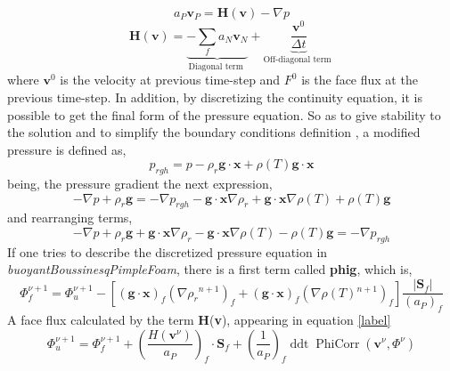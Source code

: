 \begin{equation}
a_{P} \textbf{v}_{P}=\textbf{H}(\textbf{v})-\nabla p
\label{3.15}
\end{equation}
\begin{equation}
\textbf{H}(\textbf{v})=\underbrace{-\sum_{f} a_{N} \textbf{v}_{N}}_{\text {Diagonal term }}+\underbrace{\frac{\textbf{v}^{0}}{\Delta t}}_{\text {Off-diagonal term }}
\label{3.16}
\end{equation}
where $\textbf{v}^{0}$ is the velocity at previous time-step and $F^{0}$ is the face flux at the previous time-step.
\newline
In addition, by discretizing the continuity equation, it is possible to get the final form of the pressure equation.
\newline
So as to give stability to the solution and to simplify the boundary conditions definition \cite{berberovic_van hinsberg_jakirlic_roisman_tropea_2009}, a modified pressure is defined as,
\begin{equation}
p_{r g h}=p-\rho_{r} \textbf{g} \cdot \textbf{x} + \rho(T) \textbf{g} \cdot \textbf{x}
\label{3.17}
\end{equation}
being, the pressure gradient the next expression,
\begin{equation}
-\nabla p+\rho_{r} \textbf{g}=-\nabla p_{r g h}-\textbf{g} \cdot \textbf{x} \nabla \rho_{r} + \textbf{g} \cdot \textbf{x} \nabla \rho(T) + \rho(T) \textbf{g}
\label{3.18}
\end{equation}
and rearranging terms, 
\begin{equation}
	-\nabla p+\rho_{r} \textbf{g} + \textbf{g} \cdot \textbf{x} \nabla \rho_{r} - \textbf{g} \cdot \textbf{x} \nabla \rho(T) - \rho(T) \textbf{g}=-\nabla p_{r g h}
	\label{3.19}
\end{equation}
If one tries to describe the discretized pressure equation in \textit{buoyantBoussinesqPimpleFoam}, there is a first term called \textbf{phig}, which is,
\begin{equation}
	\Phi_{f}^{\nu+1}=\Phi_{u}^{\nu+1} - \left[(\textbf{g} \cdot \textbf{x})_{f}\left(\nabla \rho_{r}{ }^{n+1}\right)_{f}+(\textbf{g} \cdot \textbf{x})_{f}\left(\nabla \rho(T){ }^{n+1}\right)_{f}\right]\frac{\left|\textbf{S}_{f}\right|}{\left(a_{P}\right)_{f}}
	\label{3.20}
\end{equation}
A face flux calculated by the term \textbf{H}(\textbf{v}), appearing in equation \ref{label}
\begin{equation}
\Phi_{u}^{\nu+1}=\Phi_{f}^{\nu+1} + \left(\frac{H\left(\textbf{v}^{\nu}\right)}{a_{P}}\right)_{f} \cdot \textbf{S}_{f}+\left(\frac{1}{a_{P}}\right)_{f}\operatorname{ddt} \operatorname{PhiCorr}\left(\textbf{v}^{\nu}, \Phi^{\nu}\right)
\label{3.21}
\end{equation}
